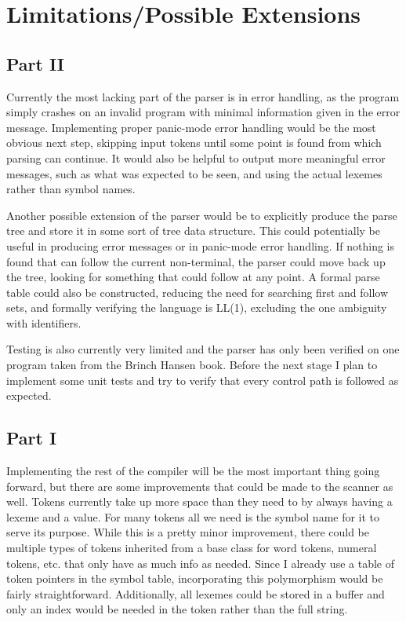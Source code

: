 \documentclass{article}
\begin{document}
    \section{Limitations/Possible Extensions}

        \subsection{Part II}

        Currently the most lacking part of the parser is in error handling, as the program simply crashes on an invalid program with minimal information given in the error message. Implementing proper panic-mode error handling would be the most obvious next step, skipping input tokens until some point is found from which parsing can continue. It would also be helpful to output more meaningful error messages, such as what was expected to be seen, and using the actual lexemes rather than symbol names. 

        Another possible extension of the parser would be to explicitly produce the parse tree and store it in some sort of tree data structure. This could potentially be useful in producing error messages or in panic-mode error handling. If nothing is found that can follow the current non-terminal, the parser could move back up the tree, looking for something that could follow at any point. A formal parse table could also be constructed, reducing the need for searching first and follow sets, and formally verifying the language is LL(1), excluding the one ambiguity with identifiers.

        Testing is also currently very limited and the parser has only been verified on one program taken from the Brinch Hansen book. Before the next stage I plan to implement some unit tests and try to verify that every control path is followed as expected. 

        \subsection{Part I}

        Implementing the rest of the compiler will be the most important thing going forward, but there are some improvements that could be made to the scanner as well. Tokens currently take up more space than they need to by always having a lexeme and a value. For many tokens all we need is the symbol name for it to serve its purpose. While this is a pretty minor improvement, there could be multiple types of tokens inherited from a base class for word tokens, numeral tokens, etc. that only have as much info as needed. Since I already use a table of token pointers in the symbol table, incorporating this polymorphism would be fairly straightforward. Additionally, all lexemes could be stored in a buffer and only an index would be needed in the token rather than the full string.
\end{document}
